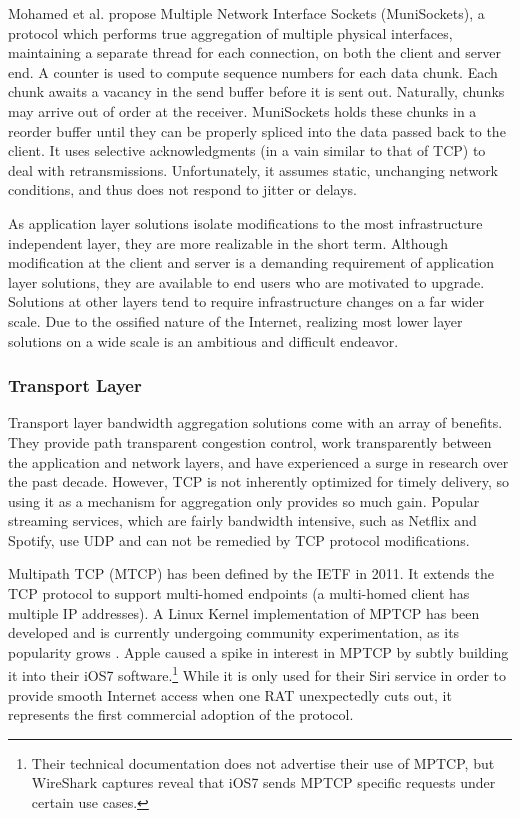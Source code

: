 \documentclass[12pt]{article}
\begin{document}
		Mohamed et al. propose Multiple Network Interface Sockets (MuniSockets), a protocol which performs true aggregation of multiple physical interfaces, maintaining a separate thread for each connection, on both the client and server end. A counter is used to compute sequence numbers for each data chunk. Each chunk awaits a vacancy in the send buffer before it is sent out. Naturally, chunks may arrive out of order at the receiver. MuniSockets holds these chunks in a reorder buffer until they can be properly spliced into the data passed back to the client. It uses selective acknowledgments (in a vain similar to that of TCP) to deal with retransmissions. Unfortunately, it assumes static, unchanging network conditions, and thus does not respond to jitter or delays\cite{mohamed2002user}.

		As application layer solutions isolate modifications to the most infrastructure independent layer, they are more realizable in the short term. Although modification at the client and server is a demanding requirement of application layer solutions, they are available to end users who are motivated to upgrade. Solutions at other layers tend to require infrastructure changes on a far wider scale. Due to the ossified nature of the Internet, realizing most lower layer solutions on a wide scale is an ambitious and difficult endeavor.

	\subsubsection{Transport Layer}

		Transport layer bandwidth aggregation solutions come with an array of benefits. They provide path transparent congestion control, work transparently between the application and network layers, and have experienced a surge in research over the past decade\cite{5763587}. However, TCP is not inherently optimized for timely delivery, so using it as a mechanism for aggregation only provides so much gain. Popular streaming services, which are fairly bandwidth intensive, such as Netflix and Spotify, use UDP and can not be remedied by TCP protocol modifications.

		Multipath TCP (MTCP) has been defined by the IETF in 2011. It extends the TCP protocol to support multi-homed endpoints (a multi-homed client has multiple IP addresses). A Linux Kernel implementation of MPTCP has been developed and is currently undergoing community experimentation, as its popularity grows \cite{barre2011multipath}. Apple caused a spike in interest in MPTCP by subtly building it into their iOS7 software.\footnote{Their technical documentation does not advertise their use of MPTCP, but WireShark captures reveal that iOS7 sends MPTCP specific requests under certain use cases.} While it is only used for their Siri service in order to provide smooth Internet access when one RAT unexpectedly cuts out, it represents the first commercial adoption of the protocol.
\end{document}
